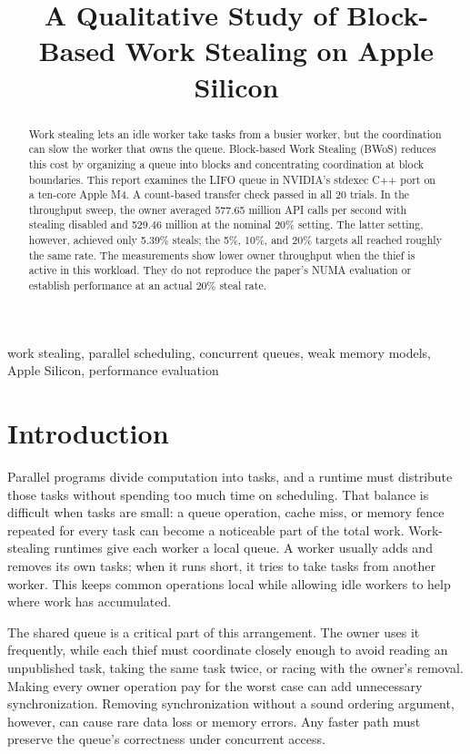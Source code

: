 \documentclass[conference]{IEEEtran}
\title{A Qualitative Study of Block-Based Work Stealing on Apple Silicon}
\author{\IEEEauthorblockN{Muhammad Umar Aibak}
\IEEEauthorblockA{School of Software Technology, Dalian University of Technology\\
\texttt{uaibak008@mail.dlut.edu.cn}}}
\begin{document}
\maketitle

\begin{abstract}
Work stealing lets an idle worker take tasks from a busier worker, but the coordination can slow the worker that owns the queue. Block-based Work Stealing (BWoS) reduces this cost by organizing a queue into blocks and concentrating coordination at block boundaries. This report examines the LIFO queue in NVIDIA's stdexec C++ port on a ten-core Apple M4. A count-based transfer check passed in all 20 trials. In the throughput sweep, the owner averaged 577.65 million API calls per second with stealing disabled and 529.46 million at the nominal 20\% setting. The latter setting, however, achieved only 5.39\% steals; the 5\%, 10\%, and 20\% targets all reached roughly the same rate. The measurements show lower owner throughput when the thief is active in this workload. They do not reproduce the paper's NUMA evaluation or establish performance at an actual 20\% steal rate.
\end{abstract}

\begin{IEEEkeywords}
work stealing, parallel scheduling, concurrent queues, weak memory models, Apple Silicon, performance evaluation
\end{IEEEkeywords}

\section{Introduction}
Parallel programs divide computation into tasks, and a runtime must distribute those tasks without spending too much time on scheduling. That balance is difficult when tasks are small: a queue operation, cache miss, or memory fence repeated for every task can become a noticeable part of the total work. Work-stealing runtimes give each worker a local queue. A worker usually adds and removes its own tasks; when it runs short, it tries to take tasks from another worker. This keeps common operations local while allowing idle workers to help where work has accumulated.

The shared queue is a critical part of this arrangement. The owner uses it frequently, while each thief must coordinate closely enough to avoid reading an unpublished task, taking the same task twice, or racing with the owner's removal. Making every owner operation pay for the worst case can add unnecessary synchronization. Removing synchronization without a sound ordering argument, however, can cause rare data loss or memory errors. Any faster path must preserve the queue's correctness under concurrent access.
\end{document}
